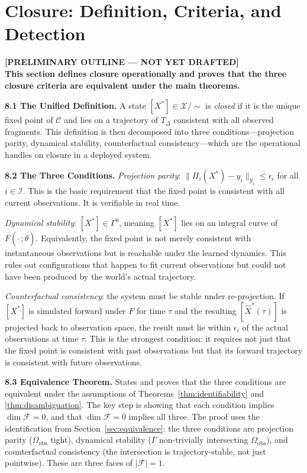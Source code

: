 \documentclass[12pt, oneside]{article}
\newcommand{\preliminary}[1]{%
  \colorbox{yellow!20}{\parbox{\dimexpr\linewidth-2\fboxsep}{%
    \textbf{\textcolor{red!70!black}{[PRELIMINARY OUTLINE --- NOT YET DRAFTED]}}\\[4pt]
    #1
  }}%
}
\newcommand{\Xmod}{\mathcal{X}/{\sim}}
\begin{document}
\section{Closure: Definition, Criteria, and Detection}
\label{sec:closure}

\preliminary{
\textbf{This section defines closure operationally and proves that the three closure
criteria are equivalent under the main theorems.}

\medskip
\textbf{8.1 The Unified Definition.}
A state $[X^*] \in \Xmod$ is \emph{closed} if it is the unique fixed point of
$\mathcal{C}$ and lies on a trajectory of $T_\Delta$ consistent with all observed
fragments. This definition is then decomposed into three conditions---projection parity,
dynamical stability, counterfactual consistency---which are the operational handles on
closure in a deployed system.

\medskip
\textbf{8.2 The Three Conditions.}
\textit{Projection parity}: $\|\Pi_i(X^*) - y_i\|_{\mathcal{Y}_i} \le \epsilon_i$ for all
$i \in \mathcal{I}$. This is the basic requirement that the fixed point is consistent with
all current observations. It is verifiable in real time.

\textit{Dynamical stability}: $[X^*] \in \Gamma^0$, meaning $[X^*]$ lies on an integral
curve of $F(\cdot\,;\hat{\theta})$. Equivalently, the fixed point is not merely consistent
with instantaneous observations but is reachable under the learned dynamics. This rules
out configurations that happen to fit current observations but could not have been produced
by the world's actual trajectory.

\textit{Counterfactual consistency}: the system must be stable under re-projection. If
$[X^*]$ is simulated forward under $F$ for time $\tau$ and the resulting
$[\hat{X}^*(\tau)]$ is projected back to observation space, the result must lie within
$\epsilon_i$ of the actual observations at time $\tau$. This is the strongest condition:
it requires not just that the fixed point is consistent with past observations but that
its forward trajectory is consistent with future observations.

\medskip
\textbf{8.3 Equivalence Theorem.}
States and proves that the three conditions are equivalent under the assumptions of
Theorems~\ref{thm:identifiability} and \ref{thm:disambiguation}. The key step is showing
that each condition implies $\dim \mathcal{F} = 0$, and that $\dim \mathcal{F} = 0$
implies all three. The proof uses the identification from Section~\ref{sec:equivalence}:
the three conditions are projection parity ($\Omega_{\mathrm{obs}}$ tight), dynamical
stability ($\Gamma$ non-trivially intersecting $\Omega_{\mathrm{obs}}$), and counterfactual
consistency (the intersection is trajectory-stable, not just pointwise). These are three
faces of $|\mathcal{F}| = 1$.

}
\end{document}
